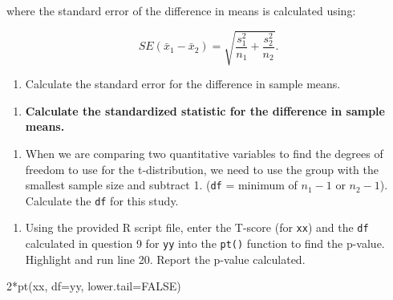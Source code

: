\documentclass[
]{report}
\newenvironment{Shaded}{\begin{snugshade}}{\end{snugshade}}
\newcommand{\AttributeTok}[1]{\textcolor[rgb]{0.77,0.63,0.00}{#1}}
\newcommand{\ConstantTok}[1]{\textcolor[rgb]{0.00,0.00,0.00}{#1}}
\newcommand{\DecValTok}[1]{\textcolor[rgb]{0.00,0.00,0.81}{#1}}
\newcommand{\FunctionTok}[1]{\textcolor[rgb]{0.00,0.00,0.00}{#1}}
\newcommand{\NormalTok}[1]{#1}
\newcommand{\SpecialCharTok}[1]{\textcolor[rgb]{0.00,0.00,0.00}{#1}}
\providecommand{\tightlist}{%
  \setlength{\itemsep}{0pt}\setlength{\parskip}{0pt}}
\begin{document}
where the standard error of the difference in means is calculated using:

\[SE(\bar{x}_1 -\bar{x}_2)=\sqrt{\frac{s_1^2}{n_1}+\frac{s_2^2}{n_2}}.\]

\begin{enumerate}
\def\labelenumi{\arabic{enumi}.}
\setcounter{enumi}{6}
\tightlist
\item
  Calculate the standard error for the difference in sample means.
\end{enumerate}

\vspace{0.5in}

\begin{enumerate}
\def\labelenumi{\arabic{enumi}.}
\setcounter{enumi}{7}
\tightlist
\item
  \textbf{Calculate the standardized statistic for the difference in sample means.}
\end{enumerate}

\vspace{0.5in}

\begin{enumerate}
\def\labelenumi{\arabic{enumi}.}
\setcounter{enumi}{8}
\tightlist
\item
  When we are comparing two quantitative variables to find the degrees of freedom to use for the t-distribution, we need to use the group with the smallest sample size and subtract 1. (\texttt{df} = minimum of \(n_1 - 1\) or \(n_2 - 1\)). Calculate the \texttt{df} for this study.
\end{enumerate}

\vspace{0.2in}
\newpage

\begin{enumerate}
\def\labelenumi{\arabic{enumi}.}
\setcounter{enumi}{9}
\tightlist
\item
  Using the provided R script file, enter the T-score (for \texttt{xx}) and the \texttt{df} calculated in question 9 for \texttt{yy} into the \texttt{pt()} function to find the p-value. Highlight and run line 20. Report the p-value calculated.
\end{enumerate}

\begin{Shaded}
\begin{Highlighting}[]
\DecValTok{2}\SpecialCharTok{*}\FunctionTok{pt}\NormalTok{(xx, }\AttributeTok{df=}\NormalTok{yy, }\AttributeTok{lower.tail=}\ConstantTok{FALSE}\NormalTok{)}
\end{Highlighting}
\end{Shaded}
\end{document}
